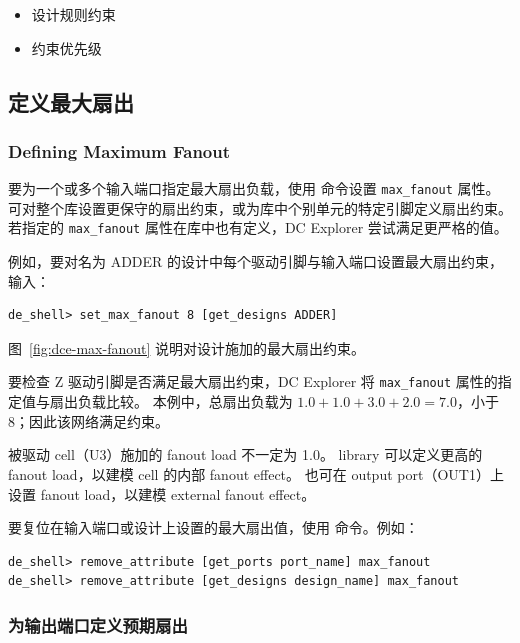 \begin{seeAlsoBox}
\begin{itemize}
  \item 设计规则约束
  \item 约束优先级
\end{itemize}
\end{seeAlsoBox}

\subsection{定义最大扇出}
\subsubsection*{Defining Maximum Fanout}

要为一个或多个输入端口指定最大扇出负载，使用  命令设置 \texttt{max\_fanout} 属性。
可对整个库设置更保守的扇出约束，或为库中个别单元的特定引脚定义扇出约束。
若指定的 \texttt{max\_fanout} 属性在库中也有定义，DC Explorer 尝试满足更严格的值。

例如，要对名为 ADDER 的设计中每个驱动引脚与输入端口设置最大扇出约束，输入：
\begin{lstlisting}
de_shell> set_max_fanout 8 [get_designs ADDER]
\end{lstlisting}

图~\ref{fig:dce-max-fanout} 说明对设计施加的最大扇出约束。


要检查 Z 驱动引脚是否满足最大扇出约束，DC Explorer 将 \texttt{max\_fanout} 属性的指定值与扇出负载比较。
本例中，总扇出负载为 $1.0 + 1.0 + 3.0 + 2.0 = 7.0$，小于 8；因此该网络满足约束。

被驱动 cell（U3）施加的 fanout load 不一定为 1.0。
library 可以定义更高的 fanout load，以建模 cell 的内部 fanout effect。
也可在 output port（OUT1）上设置 fanout load，以建模 external fanout effect。

要复位在输入端口或设计上设置的最大扇出值，使用  命令。例如：
\begin{lstlisting}
de_shell> remove_attribute [get_ports port_name] max_fanout
de_shell> remove_attribute [get_designs design_name] max_fanout
\end{lstlisting}

\subsubsection{为输出端口定义预期扇出}
